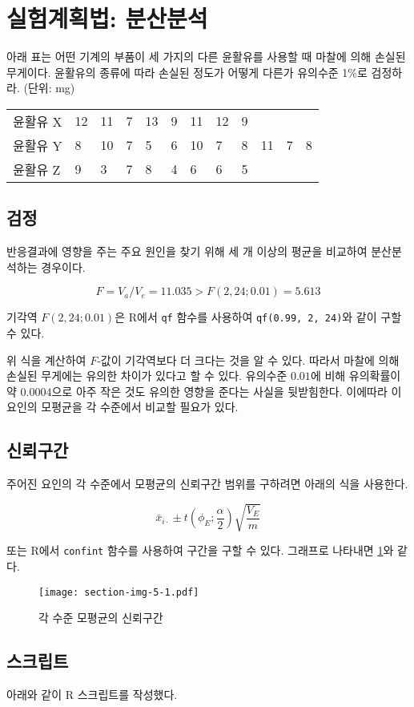 \section{실험계획법: 분산분석}
아래 표는 어떤 기계의 부품이 세 가지의 다른 윤활유를 사용할 때 마찰에
의해 손실된 무게이다. 윤활유의 종류에 따라 손실된 정도가 어떻게 다른가
유의수준 1\%로 검정하라. {\small(단위: mg)}

\begin{tabularx}{0.9\textwidth}{ l|XXXXXXXXXXX }
  \noalign{\smallskip}\hline\noalign{\smallskip}
  윤활유 X & 12 & 11 & 7 & 13 & 9 & 11 & 12 & 9 \\
  윤활유 Y & 8 & 10 & 7 & 5 & 6 & 10 & 7 & 8 & 11 & 7 & 8\\
  윤활유 Z & 9 & 3 & 7 & 8 & 4 & 6 & 6 & 5
\end{tabularx}

\subsection{검정}

반응결과에 영향을 주는 주요 원인을 찾기 위해 세 개 이상의 평균을 비교하여
분산분석하는 경우이다.


\[
F = V_a / V_e = 11.035 > F(2, 24; 0.01) = 5.613
\]

기각역 $F(2, 24; 0.01)$은 R에서 \texttt{qf} 함수를 사용하여
\texttt{qf(0.99, 2, 24)}와 같이 구할 수 있다.

위 식을 계산하여 $F$-값이 기각역보다 더 크다는 것을 알 수 있다.
따라서 마찰에 의해 손실된 무게에는 유의한 차이가 있다고 할 수 있다.
유의수준 $0.01$에 비해 유의확률이 약 $0.0004$으로 아주 작은 것도 유의한 영향을 준다는 사실을 뒷받힘한다.
이에따라 이 요인의 모평균을 각 수준에서 비교할 필요가 있다.

\subsection{신뢰구간}

주어진 요인의 각 수준에서 모평균의 신뢰구간 범위를 구하려면 아래의 식을 사용한다.

\[
 \bar{x}_{i\cdot} \pm t\left(\phi_E; \frac{\alpha}{2}\right) \sqrt{\frac{V_E}{m}}
\]

또는 R에서 \texttt{confint} 함수를 사용하여 구간을 구할 수 있다.
그래프로 나타내면 \ref{ci}와 같다.

\begin{figure}[!hb]
  \centering
  \texttt{[image: section-img-5-1.pdf]}
  \caption{각 수준 모평균의 신뢰구간}
  \label{ci}
\end{figure}

\subsection{스크립트}
아래와 같이 R 스크립트를 작성했다.





